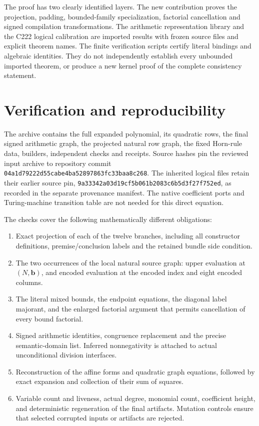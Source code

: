 \documentclass[11pt,a4paper]{article}
\theoremstyle{definition}\newtheorem{definition}[theorem]{Definition}
\theoremstyle{remark}\newtheorem{remark}[theorem]{Remark}
\numberwithin{equation}{section}
\begin{document}
The proof has two clearly identified layers. The new contribution proves
the projection, padding, bounded-family specialization, factorial
cancellation and signed
compilation transformations. The arithmetic representation library and
the C222 logical calibration are imported results with frozen source
files and explicit theorem names. The finite verification scripts certify
literal bindings and algebraic identities. They do not independently
establish every unbounded imported theorem, or produce a new kernel proof
of the complete consistency statement.

\section{Verification and reproducibility}
\label{sec:verification}

The archive contains the full expanded polynomial, its quadratic rows,
the final signed arithmetic graph, the projected natural row graph,
the fixed Horn-rule data, builders, independent checks and receipts.
Source hashes pin the reviewed input archive to repository commit
\texttt{04a1d79222d55cabe4ba52897863fc33baa8c268}.
The inherited logical files retain their earlier source pin,
\texttt{9a33342a03d19cf5b061b2083c6b5d3f27f752ed}, as recorded in the
separate provenance manifest.
The native coefficient ports and Turing-machine transition table are not
needed for this direct equation.

The checks cover the following mathematically different obligations:
\begin{enumerate}
\item Exact projection of each of the twelve branches, including all
      constructor definitions, premise/conclusion labels and the retained
      bundle side condition.
\item The two occurrences of the local natural source graph: upper
      evaluation at \((N,\boldsymbol b)\), and encoded evaluation at the
      encoded index and eight encoded columns.
\item The literal mixed bounds, the endpoint equations, the diagonal
      label majorant, and the enlarged factorial argument that permits
      cancellation of every bound factorial.
\item Signed arithmetic identities, congruence replacement and the precise
      semantic-domain list. Inferred nonnegativity is attached to actual
      unconditional division interfaces.
\item Reconstruction of the affine forms and quadratic graph equations,
      followed by exact expansion and collection of their sum of squares.
\item Variable count and liveness, actual degree, monomial count,
      coefficient height, and deterministic regeneration of the final
      artifacts. Mutation controls ensure that selected corrupted inputs
      or artifacts are rejected.
\end{enumerate}
\end{document}

